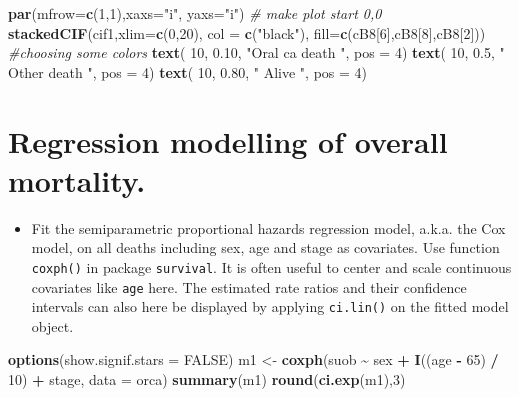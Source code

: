 \documentclass[
]{book}
\newenvironment{Shaded}{\begin{snugshade}}{\end{snugshade}}
\newcommand{\AttributeTok}[1]{\textcolor[rgb]{0.13,0.29,0.53}{#1}}
\newcommand{\CommentTok}[1]{\textcolor[rgb]{0.56,0.35,0.01}{\textit{#1}}}
\newcommand{\ConstantTok}[1]{\textcolor[rgb]{0.56,0.35,0.01}{#1}}
\newcommand{\DecValTok}[1]{\textcolor[rgb]{0.00,0.00,0.81}{#1}}
\newcommand{\FloatTok}[1]{\textcolor[rgb]{0.00,0.00,0.81}{#1}}
\newcommand{\FunctionTok}[1]{\textcolor[rgb]{0.13,0.29,0.53}{\textbf{#1}}}
\newcommand{\NormalTok}[1]{#1}
\newcommand{\OtherTok}[1]{\textcolor[rgb]{0.56,0.35,0.01}{#1}}
\newcommand{\SpecialCharTok}[1]{\textcolor[rgb]{0.81,0.36,0.00}{\textbf{#1}}}
\newcommand{\StringTok}[1]{\textcolor[rgb]{0.31,0.60,0.02}{#1}}
\providecommand{\tightlist}{%
  \setlength{\itemsep}{0pt}\setlength{\parskip}{0pt}}
\begin{document}
\begin{Shaded}
\begin{Highlighting}[]
\FunctionTok{par}\NormalTok{(}\AttributeTok{mfrow=}\FunctionTok{c}\NormalTok{(}\DecValTok{1}\NormalTok{,}\DecValTok{1}\NormalTok{),}\AttributeTok{xaxs=}\StringTok{"i"}\NormalTok{, }\AttributeTok{yaxs=}\StringTok{"i"}\NormalTok{) }\CommentTok{\# make plot start 0,0}
\FunctionTok{stackedCIF}\NormalTok{(cif1,}\AttributeTok{xlim=}\FunctionTok{c}\NormalTok{(}\DecValTok{0}\NormalTok{,}\DecValTok{20}\NormalTok{),}
           \AttributeTok{col =} \FunctionTok{c}\NormalTok{(}\StringTok{"black"}\NormalTok{),}
           \AttributeTok{fill=}\FunctionTok{c}\NormalTok{(cB8[}\DecValTok{6}\NormalTok{],cB8[}\DecValTok{8}\NormalTok{],cB8[}\DecValTok{2}\NormalTok{])) }\CommentTok{\#choosing some colors }
\FunctionTok{text}\NormalTok{( }\DecValTok{10}\NormalTok{, }\FloatTok{0.10}\NormalTok{, }\StringTok{"Oral ca death "}\NormalTok{, }\AttributeTok{pos =} \DecValTok{4}\NormalTok{)}
\FunctionTok{text}\NormalTok{( }\DecValTok{10}\NormalTok{, }\FloatTok{0.5}\NormalTok{, }\StringTok{" Other death "}\NormalTok{, }\AttributeTok{pos =} \DecValTok{4}\NormalTok{)}
\FunctionTok{text}\NormalTok{( }\DecValTok{10}\NormalTok{, }\FloatTok{0.80}\NormalTok{, }\StringTok{" Alive "}\NormalTok{, }\AttributeTok{pos =} \DecValTok{4}\NormalTok{)}
\end{Highlighting}
\end{Shaded}

\section{Regression modelling of overall mortality.}\label{regression-modelling-of-overall-mortality.}

\begin{itemize}
\tightlist
\item
  Fit the semiparametric proportional hazards regression model, a.k.a.
  the Cox model, on all deaths including sex, age and stage as
  covariates. Use function \texttt{coxph()} in package \texttt{survival}. It is often
  useful to center and scale continuous covariates like \texttt{age} here. The
  estimated rate ratios and their confidence intervals can also here be
  displayed by applying \texttt{ci.lin()} on the fitted model object.
\end{itemize}

\begin{Shaded}
\begin{Highlighting}[]
\FunctionTok{options}\NormalTok{(}\AttributeTok{show.signif.stars =} \ConstantTok{FALSE}\NormalTok{)}
\NormalTok{m1 }\OtherTok{\textless{}{-}} \FunctionTok{coxph}\NormalTok{(suob }\SpecialCharTok{\textasciitilde{}}\NormalTok{ sex }\SpecialCharTok{+} \FunctionTok{I}\NormalTok{((age }\SpecialCharTok{{-}} \DecValTok{65}\NormalTok{) }\SpecialCharTok{/} \DecValTok{10}\NormalTok{) }\SpecialCharTok{+}\NormalTok{ stage, }\AttributeTok{data =}\NormalTok{ orca)}
\FunctionTok{summary}\NormalTok{(m1)}
\FunctionTok{round}\NormalTok{(}\FunctionTok{ci.exp}\NormalTok{(m1),}\DecValTok{3}\NormalTok{)}
\end{Highlighting}
\end{Shaded}
\end{document}
